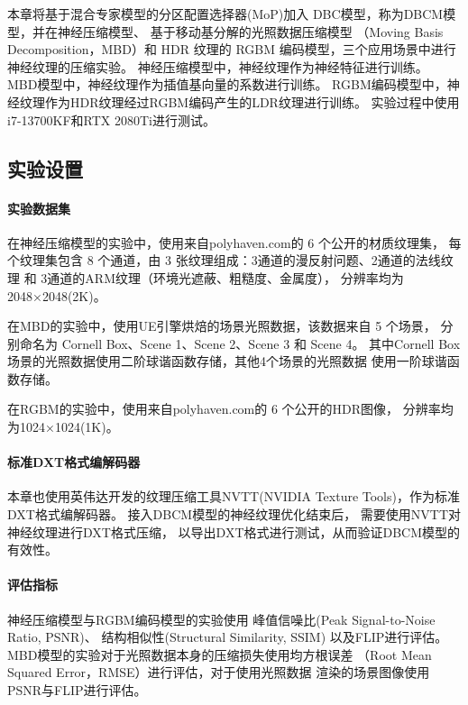 本章将基于混合专家模型的分区配置选择器(MoP)加入
DBC模型，称为DBCM模型，并在神经压缩模型、
基于移动基分解的光照数据压缩模型
\cite{silvennoinen2021moving}（Moving Basis Decomposition，MBD）和
HDR 纹理的 RGBM 编码模型，三个应用场景中进行神经纹理的压缩实验。
神经压缩模型中，神经纹理作为神经特征进行训练。
MBD模型中，神经纹理作为插值基向量的系数进行训练。
RGBM编码模型中，神经纹理作为HDR纹理经过RGBM编码产生的LDR纹理进行训练。
实验过程中使用i7-13700KF和RTX 2080Ti进行测试。

\subsection{实验设置}

\paragraph{实验数据集}

在神经压缩模型的实验中，使用来自polyhaven.com\cite{PolyHaven}的 6 个公开的材质纹理集，
每个纹理集包含 8 个通道，由 3 张纹理组成：3通道的漫反射问题、2通道的法线纹理 和 3通道的ARM纹理（环境光遮蔽、粗糙度、金属度），
分辨率均为2048×2048(2K)。

在MBD的实验中，使用UE引擎烘焙的场景光照数据，该数据来自 5 个场景，
分别命名为 Cornell Box、Scene 1、Scene 2、Scene 3 和 Scene 4。
其中Cornell Box场景的光照数据使用二阶球谐函数存储，其他4个场景的光照数据
使用一阶球谐函数存储。

在RGBM的实验中，使用来自polyhaven.com\cite{PolyHaven}的 6 个公开的HDR图像，
分辨率均为1024×1024(1K)。

\paragraph{标准DXT格式编解码器}

本章也使用英伟达开发的纹理压缩工具NVTT(NVIDIA Texture Tools)，作为标准DXT格式编解码器。
接入DBCM模型的神经纹理优化结束后，
需要使用NVTT对神经纹理进行DXT格式压缩，
以导出DXT格式进行测试，从而验证DBCM模型的有效性。

\paragraph{评估指标}

神经压缩模型与RGBM编码模型的实验使用
峰值信噪比(Peak Signal-to-Noise Ratio, PSNR)、
结构相似性\cite{wang2004image}(Structural Similarity, SSIM)
以及FLIP\cite{andersson2020flip}进行评估。
MBD模型的实验对于光照数据本身的压缩损失使用均方根误差
（Root Mean Squared Error，RMSE）进行评估，对于使用光照数据
渲染的场景图像使用PSNR与FLIP进行评估。


